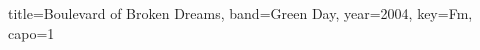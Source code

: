 \documentclass{skrul-leadsheet}
\begin{document}
\begin{song}[transpose-capo=true]{title={Boulevard of Broken Dreams}, band={Green Day}, year={2004}, key={Fm}, capo={1}}



\end{song}
\end{document}
